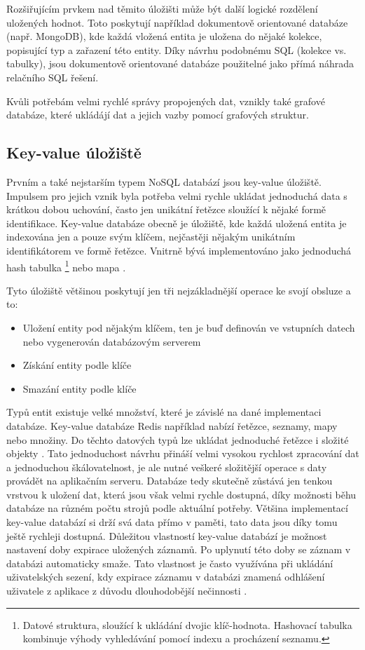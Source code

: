 Rozšiřujícím prvkem nad těmito úložišti může být další logické rozdělení uložených hodnot. Toto poskytují například dokumentově orientované databáze (např. MongoDB), kde každá vložená entita je uložena do nějaké kolekce, popisující typ a zařazení této entity. Díky návrhu podobnému SQL (kolekce vs. tabulky), jsou dokumentově orientované databáze použitelné jako přímá náhrada relačního SQL řešení.

Kvůli potřebám velmi rychlé správy propojených dat, vznikly také grafové databáze, které ukládájí dat a jejich vazby pomocí grafových struktur.

\subsection{Key-value úložiště}
\label{section:keyValueDB}
Prvním a také nejstarším typem NoSQL databází jsou key-value úložiště. Impulsem pro jejich vznik byla potřeba velmi rychle ukládat jednoduchá data s krátkou dobou uchování, často jen unikátní řetězce sloužící k nějaké formě identifikace.
Key-value databáze obecně je úložiště, kde každá uložená entita je indexována jen a pouze svým klíčem, nejčastěji nějakým unikátním identifikátorem ve formě řetězce. 
Vnitrně bývá implementováno jako jednoduchá hash tabulka \footnote{Datové struktura, sloužící k ukládání dvojic klíč-hodnota. Hashovací tabulka kombinuje výhody vyhledávání pomocí indexu a procházení seznamu.} nebo mapa \cite{beltrameKeyValue}.  

\vspace{0.5cm}
\noindent Tyto úložiště většinou poskytují jen tři nejzákladnější operace ke svojí obsluze a to:
\begin{itemize}
\item Uložení entity pod nějakým klíčem, ten je buď definován ve vstupních datech nebo vygenerován databázovým serverem
\item Získání entity podle klíče
\item Smazání entity podle klíče
\end{itemize}
Typů entit existuje velké množství, které je závislé na dané implementaci databáze. Key-value databáze Redis například nabízí řetězce, seznamy, mapy nebo množiny. Do těchto datových typů lze ukládat jednoduché řetězce i složité objekty \cite{redisDocs}.
Tato jednoduchost návrhu přináší velmi vysokou rychlost zpracování dat a jednoduchou škálovatelnost, je ale nutné veškeré složitější operace s daty provádět na aplikačním serveru. Databáze tedy skutečně zůstává jen tenkou vrstvou k uložení dat, která jsou však velmi rychle dostupná, díky možnosti běhu databáze na různém počtu strojů podle aktuální potřeby. Většina implementací key-value databází si drží svá data přímo v paměti, tato data jsou díky tomu ještě rychleji dostupná.
Důležitou vlastností key-value databází je možnost nastavení doby expirace uložených záznamů. Po uplynutí této doby se záznam v databázi automaticky smaže. Tato vlastnost je často využívána při ukládání uživatelských sezení, kdy expirace záznamu v databázi znamená odhlášení uživatele z aplikace z důvodu dlouhodobější nečinnosti \cite{redisDocs}.

